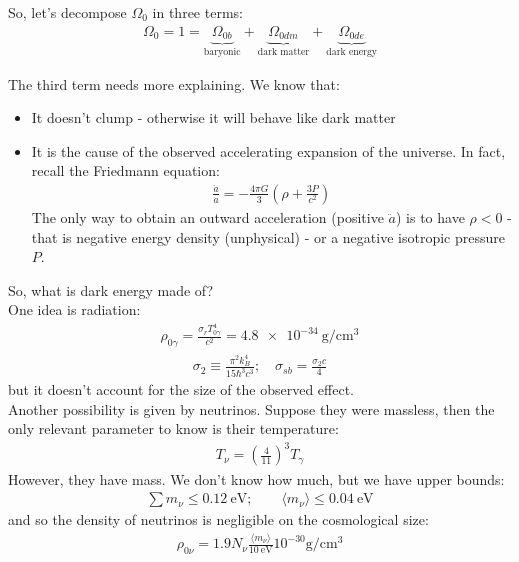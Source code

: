 \documentclass[../PhysUniverse.tex]{subfiles}
\begin{document}
So, let's decompose $\Omega_0$ in three terms:
\begin{align*}
\Omega_0 = 1 = \underbrace{\Omega_{0b}}_{\text{baryonic}} + \underbrace{\Omega_{0dm}}_{\text{dark matter}} + \underbrace{\Omega_{0de}}_{\text{dark energy}}
\end{align*}

The third term needs more explaining. We know that:
\begin{itemize}
\item It doesn't clump - otherwise it will behave like dark matter
\item It is the cause of the observed accelerating expansion of the universe. In fact, recall the Friedmann equation:
\begin{align*}
\frac{\ddot{a}}{a} = -\frac{4\pi G}{3}\left(\rho + \frac{3P}{c^2}\right)
\end{align*}
The only way to obtain an outward acceleration (positive $\ddot{a}$) is to have $\rho < 0$ - that is negative energy density (unphysical) - or a negative isotropic pressure $P$.
\end{itemize}

So, what is dark energy made of?\\
One idea is radiation:
\begin{align*}
\rho_{0\gamma} = \frac{\sigma_r T_{0\gamma}^4}{c^2} = \SI{4.8e-34}{\g\per\centi\m\cubed}
\end{align*}
\begin{align*}
\sigma_2 \equiv \frac{\pi^2 k_B^4}{15 \hbar^3 c^3}; \quad \sigma_{sb} = \frac{\sigma_2 c}{4}
\end{align*}
but it doesn't account for the size of the observed effect.\\
Another possibility is given by neutrinos. Suppose they were massless, then the only relevant parameter to know is their temperature:
\begin{align*}
T_\nu = \left(\frac{4}{11}\right)^3 T_\gamma
\end{align*}
However, they have mass. We don't know how much, but we have upper bounds:
\begin{align*}
\sum m_\nu \leq \SI{0.12}{\eV}; \qquad \langle m_\nu\rangle \leq \SI{0.04}{\eV}
\end{align*}
and so the density of neutrinos is negligible on the cosmological size:
\begin{align*}
\rho_{0\nu} = 1.9 N_\nu \frac{\langle m_\nu\rangle}{\SI{10}{\eV}} 10^{-30} \si{\g\per\centi\m\cubed}
\end{align*}
\end{document}
